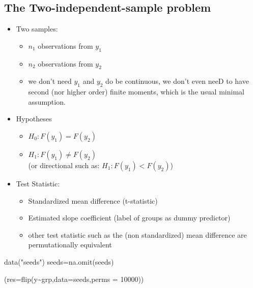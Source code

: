 \documentclass[
]{article}
\newenvironment{Shaded}{\begin{snugshade}}{\end{snugshade}}
\newcommand{\AttributeTok}[1]{\textcolor[rgb]{0.77,0.63,0.00}{#1}}
\newcommand{\DecValTok}[1]{\textcolor[rgb]{0.00,0.00,0.81}{#1}}
\newcommand{\FunctionTok}[1]{\textcolor[rgb]{0.00,0.00,0.00}{#1}}
\newcommand{\NormalTok}[1]{#1}
\newcommand{\OtherTok}[1]{\textcolor[rgb]{0.56,0.35,0.01}{#1}}
\newcommand{\SpecialCharTok}[1]{\textcolor[rgb]{0.00,0.00,0.00}{#1}}
\newcommand{\StringTok}[1]{\textcolor[rgb]{0.31,0.60,0.02}{#1}}
\providecommand{\tightlist}{%
  \setlength{\itemsep}{0pt}\setlength{\parskip}{0pt}}
\begin{document}
\hypertarget{the-two-independent-sample-problem}{%
\subsection{The Two-independent-sample
problem}\label{the-two-independent-sample-problem}}

\begin{itemize}
\tightlist
\item
  Two samples:

  \begin{itemize}
  \tightlist
  \item
    \(n_1\) observations from \(y_1\)\\
  \item
    \(n_2\) observations from \(y_2\)\\
  \item
    we don't need \(y_1\) and \(y_2\) do be continuous, we don't even
    neeD to have second (nor higher order) finite moments, which is the
    usual minimal assumption.
  \end{itemize}
\item
  Hypotheses

  \begin{itemize}
  \tightlist
  \item
    \(H_0: F(y_1)=F(y_2)\)\\
  \item
    \(H_1: F(y_1)\neq F(y_2)\)\\
    (or directional such as: \(H_1: F(y_1)<F(y_2)\))
  \end{itemize}
\end{itemize}

\begin{itemize}
\tightlist
\item
  Test Statistic:

  \begin{itemize}
  \tightlist
  \item
    Standardized mean difference (t-statistic)\\
  \item
    Estimated slope coefficient (label of groups as dummy predictor)\\
  \item
    other test statistic such as the (non standardized) mean difference
    are permutationally equivalent
  \end{itemize}
\end{itemize}

\begin{Shaded}
\begin{Highlighting}[]
\FunctionTok{data}\NormalTok{(}\StringTok{"seeds"}\NormalTok{)}
\NormalTok{seeds}\OtherTok{=}\FunctionTok{na.omit}\NormalTok{(seeds)}

\NormalTok{(}\AttributeTok{res=}\FunctionTok{flip}\NormalTok{(y}\SpecialCharTok{\textasciitilde{}}\NormalTok{grp,}\AttributeTok{data=}\NormalTok{seeds,}\AttributeTok{perms =} \DecValTok{10000}\NormalTok{))}
\end{Highlighting}
\end{Shaded}
\end{document}

